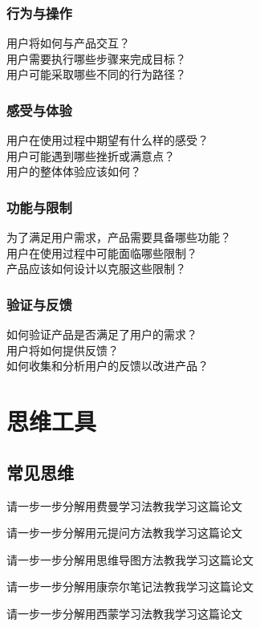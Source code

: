 \documentclass[12pt]{book}
\begin{document}
\subsection{行为与操作}
用户将如何与产品交互？\\
用户需要执行哪些步骤来完成目标？\\
用户可能采取哪些不同的行为路径？\\

\subsection{感受与体验}
用户在使用过程中期望有什么样的感受？\\
用户可能遇到哪些挫折或满意点？\\
用户的整体体验应该如何？\\

\subsection{功能与限制}
为了满足用户需求，产品需要具备哪些功能？\\
用户在使用过程中可能面临哪些限制？\\
产品应该如何设计以克服这些限制？\\

\subsection{验证与反馈}
如何验证产品是否满足了用户的需求？\\
用户将如何提供反馈？\\
如何收集和分析用户的反馈以改进产品？\\


\chapter{思维工具}

\section{常见思维}

请一步一步分解用费曼学习法教我学习这篇论文


请一步一步分解用元提问方法教我学习这篇论文


请一步一步分解用思维导图方法教我学习这篇论文


请一步一步分解用康奈尔笔记法教我学习这篇论文


请一步一步分解用西蒙学习法教我学习这篇论文
\end{document}
